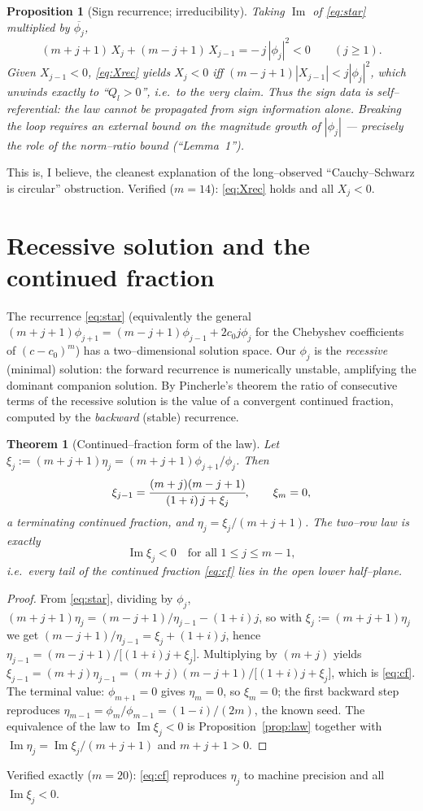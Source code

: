 \documentclass[11pt]{article}
\newtheorem{theorem}{Theorem}
\newtheorem{proposition}{Proposition}
\theoremstyle{definition}
\renewcommand{\Im}{\operatorname{Im}}
\begin{document}
\begin{proposition}[Sign recurrence; irreducibility]\label{prop:sign}
Taking $\Im$ of \eqref{eq:star} multiplied by $\overline{\phi_j}$,
\begin{equation}\label{eq:Xrec}
(m+j+1)\,X_j+(m-j+1)\,X_{j-1}=-\,j\,|\phi_j|^2<0 \qquad(j\ge 1).
\end{equation}
Given $X_{j-1}<0$, \eqref{eq:Xrec} yields $X_j<0$ iff
$(m-j+1)|X_{j-1}|<j|\phi_j|^2$, which unwinds exactly to ``$Q_l>0$'', i.e.\ to the very
claim. Thus the sign data is self--referential: the law cannot be propagated from sign
information alone. Breaking the loop requires an external bound on the \emph{magnitude}
growth of $|\phi_j|$ --- precisely the role of the norm--ratio bound (``Lemma~1'').
\end{proposition}
This is, I believe, the cleanest explanation of the long--observed ``Cauchy--Schwarz is
circular'' obstruction. Verified ($m=14$): \eqref{eq:Xrec} holds and all $X_j<0$.

\section{Recessive solution and the continued fraction}
The recurrence \eqref{eq:star} (equivalently the general $(m+j+1)\phi_{j+1}=(m-j+1)\phi_{j-1}
+2c_0 j\phi_j$ for the Chebyshev coefficients of $(c-c_0)^m$) has a two--dimensional solution
space. Our $\phi_j$ is the \emph{recessive} (minimal) solution: the forward recurrence is
numerically unstable, amplifying the dominant companion solution. By Pincherle's theorem the
ratio of consecutive terms of the recessive solution is the value of a convergent continued
fraction, computed by the \emph{backward} (stable) recurrence.

\begin{theorem}[Continued--fraction form of the law]\label{thm:cf}
Let $\xi_j:=(m+j+1)\eta_j=(m+j+1)\phi_{j+1}/\phi_j$. Then
\begin{equation}\label{eq:cf}
\xi_{j-1}=\cfrac{(m+j)(m-j+1)}{(1+i)\,j+\xi_j},\qquad \xi_m=0,
\end{equation}
a terminating continued fraction, and $\eta_j=\xi_j/(m+j+1)$. The two--row law is exactly
\[
\Im\xi_j<0\quad\text{for all }1\le j\le m-1,
\]
i.e.\ every tail of the continued fraction \eqref{eq:cf} lies in the open lower half--plane.
\end{theorem}
\begin{proof}
From \eqref{eq:star}, dividing by $\phi_j$, $(m+j+1)\eta_j=(m-j+1)/\eta_{j-1}-(1+i)j$, so
with $\xi_j:=(m+j+1)\eta_j$ we get $(m-j+1)/\eta_{j-1}=\xi_j+(1+i)j$, hence
$\eta_{j-1}=(m-j+1)\big/\big[(1+i)j+\xi_j\big]$. Multiplying by $(m+j)$ yields
$\xi_{j-1}=(m+j)\eta_{j-1}=(m+j)(m-j+1)\big/\big[(1+i)j+\xi_j\big]$, which is \eqref{eq:cf}. The terminal value: $\phi_{m+1}=0$ gives $\eta_m=0$, so
$\xi_m=0$; the first backward step reproduces $\eta_{m-1}=\phi_m/\phi_{m-1}=(1-i)/(2m)$, the
known seed. The equivalence of the law to $\Im\xi_j<0$ is Proposition~\ref{prop:law} together
with $\Im\eta_j=\Im\xi_j/(m+j+1)$ and $m+j+1>0$.
\end{proof}
Verified exactly ($m=20$): \eqref{eq:cf} reproduces $\eta_j$ to machine precision and all
$\Im\xi_j<0$.
\end{document}
